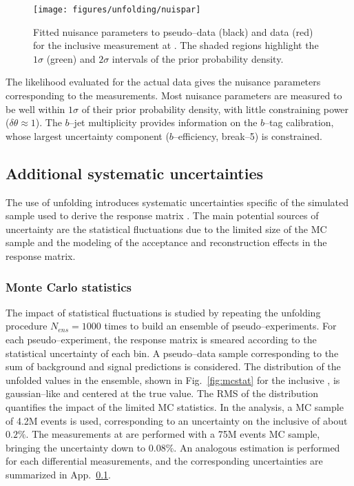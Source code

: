 \begin{figure}[!htb]\centering
  \texttt{[image: figures/unfolding/nuispar]}
  \caption{Fitted nuisance parameters to pseudo--data (black) and data
    (red) for the inclusive \ac{} measurement at \eighttev{}. The
    shaded regions highlight the $1\sigma$ (green) and $2\sigma$
    intervals of the prior probability density.}
  \label{fig:nuispar}
\end{figure}

The likelihood evaluated for the actual data gives the nuisance
parameters corresponding to the measurements. 
Most nuisance parameters are measured to be well within $1\sigma$ of
their prior probability density, with little constraining power
($\delta\theta\approx1$). The $b$--jet multiplicity provides
information on the $b$--tag calibration, whose largest uncertainty
component ($b$--efficiency, break--5) is constrained.

\subsection{Additional systematic uncertainties}

The use of unfolding introduces systematic uncertainties
specific of the \ttbar{} simulated sample used to derive the response
matrix \TrasfMatrix{}.
The main potential sources of uncertainty are the statistical fluctuations due
to the limited size of the MC sample and the modeling of the acceptance
and reconstruction effects in the response matrix.

\subsubsection{Monte Carlo statistics}
\label{sec:mcstat}

The impact of statistical fluctuations is studied by repeating the
unfolding procedure $N_{ens}=1000$ times to build an ensemble of
pseudo--experiments. For each pseudo--experiment, the response matrix
is smeared according to the statistical uncertainty of each bin. A
pseudo--data sample corresponding to the sum of background and signal
predictions is considered. The distribution of the unfolded \ac{}
values in the ensemble, shown in Fig.~\ref{fig:mcstat} for the
inclusive \ac{} \eighttev{}, is gaussian--like and centered at the
true \ac{} value. The RMS of the distribution quantifies the impact
of the limited MC statistics. In the \seventev{} analysis, a MC sample
of 4.2M \ttbar{} events is used, corresponding to an uncertainty on the
inclusive \ac{} of about $0.2\%$. The measurements at \eighttev{} are
performed with a 75M events MC sample, bringing the uncertainty down to
$0.08\%$. An analogous estimation is performed for each differential
measurements, and the corresponding uncertainties are summarized in
App.~\ref{}.

